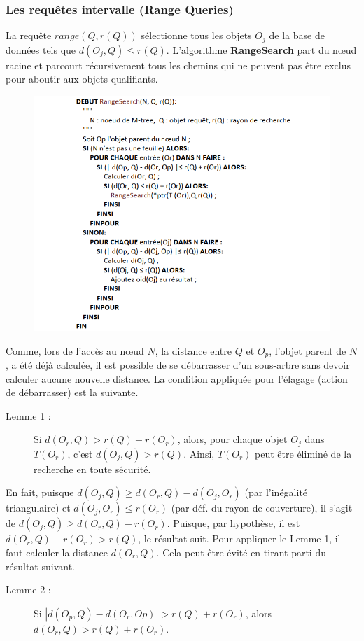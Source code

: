 \subsubsection{Les requêtes intervalle (Range Queries)}
La requête $ range(Q, r(Q)) $ sélectionne tous les objets $ O_j $ de la base de données tels que $ d(O_j, Q) \le r(Q) $. L'algorithme \textbf{RangeSearch} part du nœud racine et parcourt récursivement tous les chemins qui ne peuvent pas être exclus pour aboutir aux objets qualifiants.
\begin{figure}[H]
	\centering
	\includegraphics[width=.9 \textwidth]{Figures/rangesearxh.png} %
\end{figure} 

Comme, lors de l'accès au nœud $ N $, la distance entre $ Q $ et $ O_p $, l'objet parent de $ N $, a été déjà calculée, il est possible de se débarrasser d'un sous-arbre sans devoir calculer aucune nouvelle distance. La condition appliquée pour l'élagage (action de débarrasser) est la suivante.
\begin{description}
	\item[Lemme 1 :] Si $ d(O_r, Q) > r(Q) + r(O_r) $, alors, pour chaque objet $ O_j  $ dans $ T (O_r) $, c'est $ d(O_j, Q) > r(Q) $. Ainsi, $ T (O_r) $ peut être éliminé de la recherche en toute sécurité.
\end{description}
En fait, puisque $ d(O_j, Q) \ge d(O_r, Q) - d(O_j, O_r) $ (par l'inégalité triangulaire) et $ d(O_j, O_r) \le r(O_r) $ (par déf. du rayon de couverture), il s'agit de $ d(O_j, Q) \ge d(O_r, Q)-r(O_r) $.
Puisque, par hypothèse, il est $ d(O_r, Q) - r(O_r) > r(Q) $, le résultat suit.
Pour appliquer le Lemme 1, il faut calculer la distance $ d(O_r, Q) $. Cela peut être évité en tirant parti du résultat suivant.
\begin{description}
	\item[Lemme 2 :]  Si $ | d(O_p, Q) - d(O_r, Op) |> r(Q) + r(O_r) $, alors $ d(O_r, Q) > r(Q) + r(O_r) $.
\end{description}

